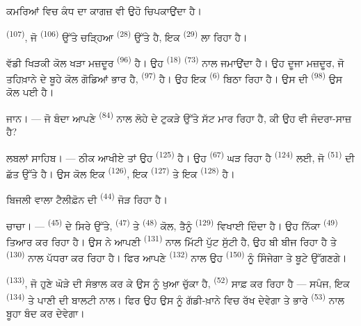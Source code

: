 ਕਮਰਿਆਂ ਵਿਚ ਕੰਧ ਦਾ ਕਾਗਜ਼ ਵੀ ਉਹੋ ਚਿਪਕਾਉਂਦਾ ਹੈ।

 \textsuperscript{(107)}, ਜੋ 
\textsuperscript{(106)} ਉੱਤੇ ਚੜ੍ਹਿਆ  \textsuperscript{(28)} ਉੱਤੇ
ਹੈ, ਇਕ  \textsuperscript{(29)} ਲਾ ਰਿਹਾ ਹੈ।

ਵੱਡੀ ਖਿੜਕੀ ਕੋਲ ਖੜਾ ਮਜ਼ਦੂਰ  \textsuperscript{(96)} ਹੈ। ਉਹ
 \textsuperscript{(18)}  \textsuperscript{(73)} ਨਾਲ
ਜਮਾਉਂਦਾ ਹੈ। ਉਹ ਦੂਜਾ ਮਜ਼ਦੂਰ, ਜੋ ਤਹਿਖ਼ਾਨੇ ਦੇ ਬੂਹੇ ਕੋਲ ਗੋਡਿਆਂ ਭਾਰ ਹੈ,
 \textsuperscript{(97)} ਹੈ। ਉਹ ਇਕ 
\textsuperscript{(6)} ਬਿਠਾ ਰਿਹਾ ਹੈ। ਉਸ ਦੀ  \textsuperscript{(98)} ਉਸ
ਕੋਲ ਪਈ ਹੈ।

\textsc{ਜਾਨ}। --- ਜੋ ਬੰਦਾ ਆਪਣੇ  \textsuperscript{(84)} ਨਾਲ ਲੋਹੇ ਦੇ
ਟੁਕੜੇ ਉੱਤੇ ਸੱਟ ਮਾਰ ਰਿਹਾ ਹੈ, ਕੀ ਉਹ ਵੀ ਜੰਦਰਾ-ਸਾਜ਼ ਹੈ?

\textsc{ਲਬਲਾਂ ਸਾਹਿਬ}। --- ਠੀਕ ਆਖੀਏ ਤਾਂ ਉਹ  \textsuperscript{(125)}
ਹੈ। ਉਹ  \textsuperscript{(67)} ਘੜ ਰਿਹਾ ਹੈ
 \textsuperscript{(124)} ਲਈ, ਜੋ 
\textsuperscript{(51)} ਦੀ ਛੱਤ ਉੱਤੇ ਹੈ। ਉਸ ਕੋਲ ਇਕ 
\textsuperscript{(126)}, ਇਕ  \textsuperscript{(127)} ਤੇ ਇਕ
 \textsuperscript{(128)} ਹੈ।

ਬਿਜਲੀ ਵਾਲਾ ਟੈਲੀਫ਼ੋਨ ਦੀ  \textsuperscript{(44)} ਜੋੜ ਰਿਹਾ ਹੈ।

\VUsaut{3.0mm}

\textsc{ਚਾਚਾ}। ---  \textsuperscript{(45)} ਦੇ ਸਿਰੇ ਉੱਤੇ,
 \textsuperscript{(47)} ਤੇ 
\textsuperscript{(48)} ਕੋਲ, ਤੈਨੂੰ  \textsuperscript{(129)} ਵਿਖਾਈ ਦਿੰਦਾ
ਹੈ। ਉਹ ਨਿੱਕਾ  \textsuperscript{(49)} ਤਿਆਰ ਕਰ ਰਿਹਾ ਹੈ। ਉਸ ਨੇ ਆਪਣੀ
 \textsuperscript{(131)} ਨਾਲ ਮਿੱਟੀ ਪੁੱਟ ਸੁੱਟੀ ਹੈ, ਉਹ ਬੀ ਬੀਜ ਰਿਹਾ ਹੈ ਤੇ
 \textsuperscript{(130)} ਨਾਲ ਪੱਧਰਾ ਕਰ ਰਿਹਾ ਹੈ। ਫਿਰ ਆਪਣੇ
 \textsuperscript{(132)} ਨਾਲ ਉਹ 
\textsuperscript{(150)} ਨੂੰ ਸਿੰਜੇਗਾ ਤੇ ਬੂਟੇ ਉੱਗਣਗੇ।

 \textsuperscript{(133)}, ਜੋ ਹੁਣੇ ਘੋੜੇ ਦੀ ਸੰਭਾਲ ਕਰ ਕੇ ਉਸ ਨੂੰ ਖੁਆ
ਚੁੱਕਾ ਹੈ,  \textsuperscript{(52)} ਸਾਫ਼ ਕਰ ਰਿਹਾ ਹੈ — ਸਪੰਜ, ਇਕ
 \textsuperscript{(134)} ਤੇ ਪਾਣੀ ਦੀ ਬਾਲਟੀ ਨਾਲ। ਫਿਰ ਉਹ ਉਸ ਨੂੰ
ਗੱਡੀ-ਖ਼ਾਨੇ ਵਿਚ ਰੱਖ ਦੇਵੇਗਾ ਤੇ ਭਾਰੇ  \textsuperscript{(53)} ਨਾਲ ਬੂਹਾ
ਬੰਦ ਕਰ ਦੇਵੇਗਾ।

